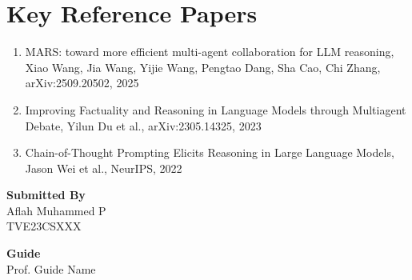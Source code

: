 \documentclass[12pt]{article}
\newcommand{\studentname}{Aflah Muhammed P}
\newcommand{\rollno}{TVE23CSXXX}
\newcommand{\guidename}{Prof. Guide Name}
\begin{document}
\section*{Key Reference Papers}
\begin{enumerate}
  \item MARS: toward more efficient multi-agent collaboration for LLM reasoning, Xiao Wang, Jia Wang, Yijie Wang, Pengtao Dang, Sha Cao, Chi Zhang, arXiv:2509.20502, 2025
  \item Improving Factuality and Reasoning in Language Models through Multiagent Debate, Yilun Du et al., arXiv:2305.14325, 2023
  \item Chain-of-Thought Prompting Elicits Reasoning in Large Language Models, Jason Wei et al., NeurIPS, 2022
\end{enumerate}
\vspace{1.5em}

\noindent\textbf{Submitted By}\\
\studentname\\
\rollno

\vspace{1em}
\noindent\textbf{Guide}\\
\guidename
\end{document}

